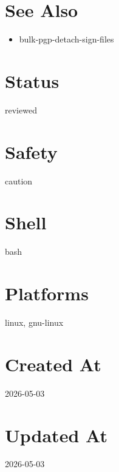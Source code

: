 \documentclass{article}
\begin{document}
\section*{See Also}
\begin{itemize}
  \item bulk-pgp-detach-sign-files
\end{itemize}

\section*{Status}
reviewed

\section*{Safety}
caution

\section*{Shell}
bash

\section*{Platforms}
linux, gnu-linux

\section*{Created At}
2026-05-03

\section*{Updated At}
2026-05-03
\end{document}
